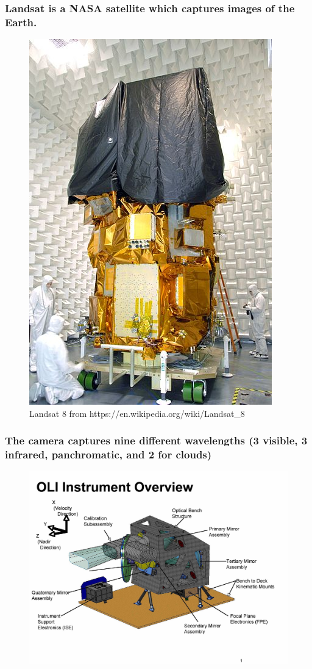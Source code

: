 \documentclass{beamer}
\begin{document}
    \begin{frame}
        \frametitle{Landsat is a NASA satellite which captures images of the Earth.}
            \begin{figure}
            \includegraphics[width=.40\paperheight]{figures/groundlandsat.jpg}
            \caption{Landsat 8 from https://en.wikipedia.org/wiki/Landsat\_8}
            \end{figure}
    \end{frame}

    \begin{frame}
        \frametitle{The camera captures nine different wavelengths (3 visible, 3 infrared, panchromatic, and 2 for clouds)}
            \begin{figure}
            \includegraphics[width=.9\paperheight]{figures/landsatimager.jpg}
         \end{figure}
    \end{frame}
\end{document}
